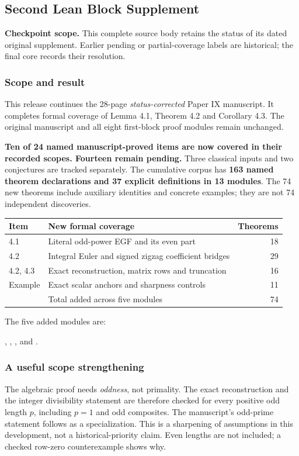 \clearpage\subsection{Second Lean Block Supplement}\label{app:sup2}
\noindent\textbf{Checkpoint scope.} This complete source body retains the status of its dated original supplement. Earlier pending or partial-coverage labels are historical; the final core records their resolution.\par\medskip
\subsubsection*{Scope and result}
This release continues the 28-page \emph{status-corrected} Paper IX manuscript. It completes formal coverage of Lemma 4.1, Theorem 4.2 and Corollary 4.3. The original manuscript and all eight first-block proof modules remain unchanged.

\textbf{Ten of 24 named manuscript-proved items are now covered in their recorded scopes. Fourteen remain pending.} Three classical inputs and two conjectures are tracked separately. The cumulative corpus has \textbf{163 named theorem declarations and 37 explicit definitions in 13 modules}. The 74 new theorems include auxiliary identities and concrete examples; they are not 74 independent discoveries.

\begin{center}
\begin{tabular}{@{}p{}p{}r@{}}
\toprule
Item & New formal coverage & Theorems\\\midrule
4.1 & Literal odd-power EGF and its even part & 18\\
4.2 & Integral Euler and signed zigzag coefficient bridges & 29\\
4.2, 4.3 & Exact reconstruction, matrix rows and truncation & 16\\
Example & Exact scalar anchors and sharpness controls & 11\\\midrule
 & Total added across five modules & 74\\\bottomrule
\end{tabular}
\end{center}
The five added modules are:\par
{\small{}, , ,\newline
{} and .}

\subsubsection*{A useful scope strengthening}
The algebraic proof needs \emph{oddness}, not primality. The exact reconstruction and the integer divisibility statement are therefore checked for every positive odd length $p$, including $p=1$ and odd composites. The manuscript's odd-prime statement follows as a specialization. This is a sharpening of assumptions in this development, not a historical-priority claim. Even lengths are not included; a checked row-zero counterexample shows why.

